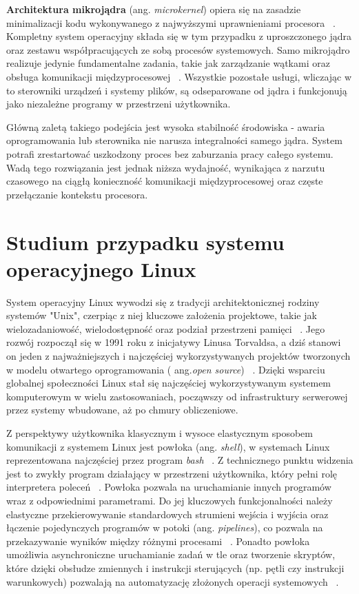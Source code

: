 \textbf{Architektura mikrojądra} (ang. \textit{microkernel}) opiera się na zasadzie minimalizacji kodu wykonywanego z najwyższymi uprawnieniami procesora ~\cite{Abraham_Silberschatz}. Kompletny system operacyjny składa się w tym przypadku z uproszczonego jądra
oraz zestawu współpracujących ze sobą procesów systemowych. Samo mikrojądro realizuje jedynie fundamentalne zadania, takie jak zarządzanie wątkami oraz obsługa komunikacji międzyprocesowej ~\cite{Tanenbaum}. Wszystkie pozostałe usługi, wliczając w to sterowniki urządzeń i systemy plików, są odseparowane od jądra i funkcjonują jako niezależne programy w przestrzeni użytkownika.

Główną zaletą takiego podejścia jest wysoka stabilność środowiska - awaria oprogramowania lub sterownika nie narusza integralności samego jądra. System potrafi zrestartować uszkodzony proces bez zaburzania pracy całego systemu. 
Wadą tego rozwiązania jest jednak niższa wydajność, wynikająca z narzutu czasowego na ciągłą konieczność komunikacji międzyprocesowej oraz częste przełączanie kontekstu procesora.

\section{Studium przypadku systemu operacyjnego Linux}
System operacyjny Linux wywodzi się z  tradycji architektonicznej rodziny systemów "Unix", czerpiąc z niej kluczowe założenia projektowe, takie jak wielozadaniowość, wielodostępność oraz podział przestrzeni pamięci ~\cite{Tanenbaum}. Jego rozwój rozpoczął się w 1991 roku z inicjatywy Linusa Torvaldsa, a dziś stanowi on jeden z najważniejszych i najczęściej wykorzystywanych projektów tworzonych w modelu otwartego oprogramowania ( ang.\textit{open source}) ~\cite{Tanenbaum}.
Dzięki wsparciu globalnej społeczności Linux stał się najczęściej wykorzystywanym systemem komputerowym w wielu zastosowaniach, począwszy od  infrastruktury serwerowej przez systemy wbudowane, aż po chmury obliczeniowe.

Z perspektywy użytkownika klasycznym i wysoce elastycznym sposobem komunikacji z systemem Linux  jest powłoka (ang. \textit{shell}), w systemach Linux reprezentowana najczęściej przez program \textit{bash} ~\cite{Tanenbaum}. Z technicznego punktu widzenia jest to zwykły program działający w przestrzeni użytkownika, który pełni rolę interpretera poleceń ~\cite{Tanenbaum}. Powłoka pozwala na uruchamianie innych programów wraz z odpowiednimi parametrami.
Do jej kluczowych funkcjonalności należy elastyczne przekierowywanie standardowych strumieni wejścia i wyjścia oraz łączenie pojedynczych programów w potoki (ang. \textit{pipelines}), co pozwala na przekazywanie wyników między różnymi procesami ~\cite{Tanenbaum}.
Ponadto powłoka umożliwia asynchroniczne uruchamianie zadań w tle oraz tworzenie skryptów, które dzięki obsłudze zmiennych i instrukcji sterujących (np. pętli czy instrukcji warunkowych) pozwalają na automatyzację złożonych operacji systemowych ~\cite{Abraham_Silberschatz}.


